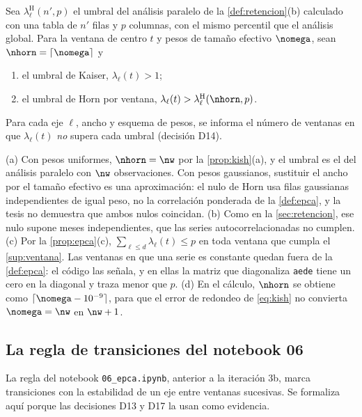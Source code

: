 \begin{definicion}\label{def:umbral-ventana}
Sea $\lambda^{\mathrm H}_\ell(n',p)$ el umbral del análisis paralelo de la \cref{def:retencion}(b)
calculado con una tabla de $n'$ filas y $p$ columnas, con el mismo percentil que el análisis
global. Para la ventana de centro $t$ y pesos de tamaño efectivo $\nomega$, sean
$\nhorn=\lceil\nomega\rceil$ y
\begin{enumerate}[label=(\alph*)]
  \item el umbral de Kaiser, $\lambda_\ell(t)>1$;
  \item el umbral de Horn por ventana, $\lambda_\ell(t)>\lambda^{\mathrm H}_\ell(\nhorn,p)$.
\end{enumerate}
Para cada eje $\ell$, ancho y esquema de pesos, se informa el número de ventanas en que
$\lambda_\ell(t)$ \emph{no} supera cada umbral (decisión D14).
\end{definicion}

\begin{observacion}\label{obs:umbral-ventana}
(a) Con pesos uniformes, $\nhorn=\nw$ por la \cref{prop:kish}(a), y el umbral es el del análisis
paralelo con $\nw$ observaciones. Con pesos gaussianos, sustituir el ancho por el tamaño efectivo
es una aproximación: el nulo de Horn usa filas gaussianas independientes de igual peso, no la
correlación ponderada de la \cref{def:epca}, y la tesis no demuestra que ambos nulos coincidan.
(b) Como en la \cref{sec:retencion}, ese nulo supone meses independientes, que las series
autocorrelacionadas no cumplen. (c) Por la \cref{prop:epca}(c),
$\sum_{\ell\le d}\lambda_\ell(t)\le p$ en toda ventana que cumpla el \cref{sup:ventana}. Las
ventanas en que una serie es constante quedan fuera de la \cref{def:epca}: el código las señala,
y en ellas la matriz que diagonaliza \texttt{aede} tiene un cero en la diagonal y traza menor que
$p$. (d) En el cálculo, $\nhorn$ se obtiene como $\lceil\nomega-10^{-9}\rceil$, para que el error de
redondeo de \cref{eq:kish} no convierta $\nomega=\nw$ en $\nw+1$.
\end{observacion}

\subsection{La regla de transiciones del notebook 06}
\label{sec:regla06}

La regla del notebook \texttt{06\_epca.ipynb}, anterior a la iteración 3b, marca transiciones con
la estabilidad de un eje entre ventanas sucesivas. Se formaliza aquí porque las decisiones D13 y
D17 la usan como evidencia.

